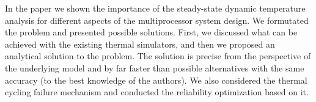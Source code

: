 In the paper we shown the importance of the steady-state dynamic temperature analysis for different aspects of the multiprocessor system design. We formutated the problem and presented possible solutions. First, we discussed what can be achieved with the existing thermal simulators, and then we proposed an analytical solution to the problem. The solution is precise from the perspective of the underlying model and by far faster than possible alternatives with the same accuracy (to the best knowledge of the authors). We also considered the thermal cycling failure mechanism and conducted the reliability optimization based on it.
